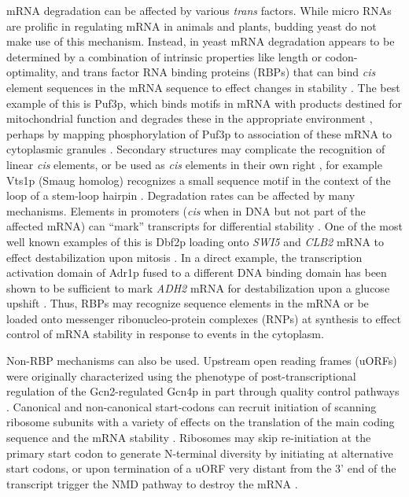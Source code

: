 mRNA
degradation can be affected by various \textit{trans} factors. While micro RNAs
are prolific in regulating mRNA in animals and plants, budding yeast
do not make use of this mechanism. Instead, in yeast mRNA degradation
appears to be determined by a combination of intrinsic properties like
length or codon-optimality, and trans factor RNA binding proteins
(RBPs) that can bind \textit{cis} element sequences in the mRNA sequence to
effect changes in stability 
\parencite{li2010predicting}. The best
example of this is Puf3p, which binds motifs in mRNA with products
destined for mitochondrial function and degrades these in the
appropriate environment 
\parencite{olivas2000puf3,miller2013carbon}, perhaps by
mapping phosphorylation of Puf3p to association of these mRNA to
cytoplasmic granules 
\parencite{lee2015glucose}. Secondary structures may
complicate the recognition of linear \textit{cis} elements, or be used
as \textit{cis}
elements in their own right \parencite{li2010predicting},
for example Vts1p (Smaug homolog) recognizes a small sequence 
motif in the context of the loop of a stem-loop hairpin 
\parencite{she2017comprehensive,aviv2003rna}.
Degradation rates can be affected by many mechanisms. Elements in
promoters (\textit{cis} when in DNA but not part of the affected mRNA) can
“mark” transcripts for differential stability 
\parencite{haimovich2013gene}.
One of the most well known examples of this is Dbf2p loading onto 
\textit{SWI5}
and \textit{CLB2} mRNA to effect destabilization upon mitosis 
\parencite{trcek2011single}. 
In a direct example, the transcription activation domain of
Adr1p fused to a different DNA binding domain has been shown to be
sufficient to mark \textit{ADH2} mRNA for destabilization upon a glucose
upshift \parencite{braun2016snf1}.
Thus, RBPs may recognize sequence
elements in the mRNA or be loaded onto messenger ribonucleo-protein
complexes (RNPs) at synthesis 
\parencite{gupta2016translational}
to effect control of
mRNA stability in response to events in the cytoplasm.  

Non-RBP
mechanisms can also be used. Upstream open reading frames (uORFs) were
originally characterized using the phenotype of post-transcriptional
regulation of the Gcn2-regulated Gcn4p 
\parencite{dever1992phosphorylation}
in part through quality control pathways 
\parencite{ruiz1996utilizing}.
Canonical and non-canonical start-codons can recruit initiation of
scanning ribosome subunits with a variety of effects on the
translation of the main coding sequence and the mRNA stability
\parencite{spealman2017conserved}. Ribosomes may skip re-initiation at the
primary start codon to generate N-terminal diversity by initiating at
alternative start codons, or upon termination of a uORF very distant
from the 3' end of the transcript trigger the NMD pathway to destroy
the mRNA \parencite{dever2016mechanism}. 

